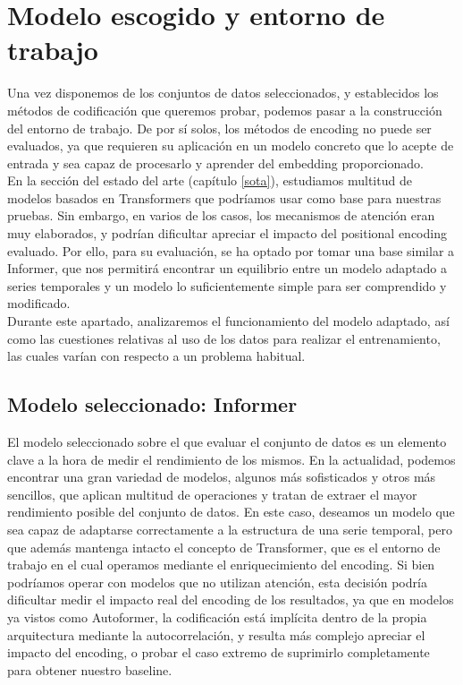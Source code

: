 \chapter{Modelo escogido y entorno de trabajo}
\label{cap5}

Una vez disponemos de los conjuntos de datos seleccionados, y establecidos los métodos de codificación que queremos probar, podemos pasar a la construcción del entorno de trabajo. De por sí solos, los métodos de encoding no puede ser evaluados, ya que requieren su aplicación en un modelo concreto que lo acepte de entrada y sea capaz de procesarlo y aprender del embedding proporcionado.\\

En la sección del estado del arte (capítulo \ref{sota}), estudiamos multitud de modelos basados en Transformers que podríamos usar como base para nuestras pruebas. Sin embargo, en varios de los casos, los mecanismos de atención eran muy elaborados, y podrían dificultar apreciar el impacto del positional encoding evaluado. Por ello, para su evaluación, se ha optado por tomar una base similar a Informer, que nos permitirá encontrar un equilibrio entre un modelo adaptado a series temporales y un modelo lo suficientemente simple para ser comprendido y modificado.\\

Durante este apartado, analizaremos el funcionamiento del modelo adaptado, así como las cuestiones relativas al uso de los datos para realizar el entrenamiento, las cuales varían con respecto a un problema habitual.

\section{Modelo seleccionado: Informer}

El modelo seleccionado sobre el que evaluar el conjunto de datos es un elemento clave a la hora de medir el rendimiento de los mismos. En la actualidad, podemos encontrar una gran variedad de modelos, algunos más sofisticados y otros más sencillos, que aplican multitud de operaciones y tratan de extraer el mayor rendimiento posible del conjunto de datos. En este caso, deseamos un modelo que sea capaz de adaptarse correctamente a la estructura de una serie temporal, pero que además mantenga intacto el concepto de Transformer, que es el entorno de trabajo en el cual operamos mediante el enriquecimiento del encoding. Si bien podríamos operar con modelos que no utilizan atención, esta decisión podría dificultar medir el impacto real del encoding de los resultados, ya que en modelos ya vistos como Autoformer, la codificación está implícita dentro de la propia arquitectura mediante la autocorrelación, y resulta más complejo apreciar el impacto del encoding, o probar el caso extremo de suprimirlo completamente para obtener nuestro baseline.\\

